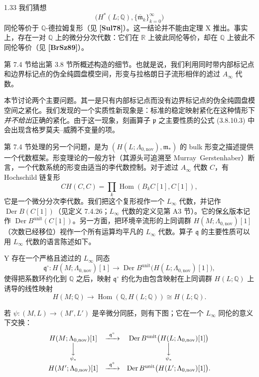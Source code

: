 \begin{remark}{1.33}\label{rem:1-33}
我们猜想
\[
  \bigl(H^*(L;\mathbb Q),
    \{\overline{\mathfrak m}_k\}_{k=0}^{\infty}\bigr)
\]
同伦等价于 $\mathbb Q$-德拉姆复形（见 \textbf{[Sul78]}）。这一结论并不能由定理 X 推出。事实上，存在一对 $\mathbb Q$ 上的微分分次代数：它们在 $\mathbb R$ 上彼此同伦等价，却在 $\mathbb Q$ 上彼此不同伦等价（见 \textbf{[BrSz89]}）。
\end{remark}

第 7.4 节给出第 3.8 节所概述构造的细节。也就是说，我们利用同时带内部标记点和边界标记点的伪全纯圆盘模空间，形变与拉格朗日子流形相伴的滤过 $A_\infty$ 代数。

本节讨论两个主要问题。其一是只有内部标记点而没有边界标记点的伪全纯圆盘模空间之紧化。我们发现的一个实质性新现象是：标准的稳定映射紧化在这种情形下\emph{并不给出}正确的紧化。由于这一现象，刻画算子 $\mathfrak p$ 之主要性质的公式 (3.8.10.3) 中会出现含格罗莫夫--威腾不变量的项。

第 7.4 节处理的另一个问题，是为
$(H(L;\Lambda_{0,\mathrm{nov}}),\mathfrak m_*)$ 的 bulk 形变之描述提供一个代数框架。形变理论的一般方针（其源头可追溯至 \mbox{Murray Gerstenhaber}）断言，一个代数系统的形变由适当的李代数控制。对于滤过 $A_\infty$ 代数 $C$，有 Hochschild 链复形
\[
  CH(C,C)=\prod_k\operatorname{Hom}(B_kC[1],C[1]),
\]
它是一个微分分次李代数。我们把这个复形视作一个 $L_\infty$ 代数，并记作 $\operatorname{Der}B(C[1])$（见定义 7.4.26；$L_\infty$ 代数的定义见第 A3 节）。它的保幺版本记作 $\operatorname{Der}B^{\mathrm{unit}}(C[1])$。另一方面，把环境辛流形的上同调群 $H(M;\Lambda_{0,\mathrm{nov}})[1]$（次数已经移位）视作一个所有运算均平凡的 $L_\infty$ 代数。算子 $\mathfrak q$ 的主要性质可以用 $L_\infty$ 代数的语言陈述如下。

\begin{theorem}{Y}\label{thm:intro-Y}
存在一个严格且滤过的 $L_\infty$ 同态
\[
  \mathfrak q^\circ\colon H(M;\Lambda_{0,\mathrm{nov}})[1]
  \longrightarrow
  \operatorname{Der}B^{\mathrm{unit}}
  \bigl(H(L;\Lambda_{0,\mathrm{nov}})[1]\bigr),
\]
使得把系数环约化到 $\mathbb Q$ 之后，映射 $\mathfrak q^\circ$ 约化为由包含映射在上同调群 $H(L;\mathbb Q)$ 上诱导的线性映射
\[
  H(M;\mathbb Q)
  \longrightarrow
  \operatorname{Hom}(\mathbb Q,H(L;\mathbb Q))
  \cong H(L;\mathbb Q).
\]

若 $\psi\colon(M,L)\to(M',L')$ 是辛微分同胚，则有下图；它在一个 $L_\infty$ 同伦的意义下交换：
\[
\begin{array}{ccc}
H(M;\Lambda_{0,\mathrm{nov}})[1]
  & \xrightarrow{\ \mathfrak q^\circ\ }
  & \operatorname{Der}B^{\mathrm{unit}}
    \bigl(H(L;\Lambda_{0,\mathrm{nov}})[1]\bigr) \\
\underset{\psi_*}{\Big\downarrow}
  && \underset{\psi_*}{\Big\downarrow} \\
H(M';\Lambda_{0,\mathrm{nov}})[1]
  & \xrightarrow{\ \mathfrak q^\circ\ }
  & \operatorname{Der}B^{\mathrm{unit}}
    \bigl(H(L';\Lambda_{0,\mathrm{nov}})[1]\bigr).
\end{array}
\]
\end{theorem}

